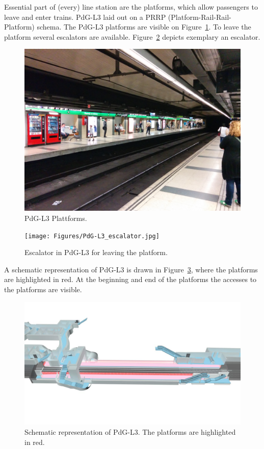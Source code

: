 Essential part of (every) line station are the platforms, which allow passengers to leave and enter trains. PdG-L3 laid out on a PRRP (Platform-Rail-Rail-Platform) schema. The PdG-L3 platforms are visible on Figure~\ref{fig:PdG-L3_platforms}. To leave the platform several escalators are available. Figure~\ref{fig:PdG-L3_escalator} depicts exemplary an escalator.

\begin{figure}[htbp]
  \centering
  \includegraphics[width=\linewidth]{Figures/PdG-L3_platform.jpg} 
  \caption{PdG-L3 Plattforms. \cite{TMB_2014}}
  \label{fig:PdG-L3_platforms}
\end{figure}

\begin{figure}[htbp]
  \centering
  \texttt{[image: Figures/PdG-L3\_escalator.jpg]} 
  \caption{Escalator in PdG-L3 for leaving the platform. \cite{TMB_2014}}
  \label{fig:PdG-L3_escalator}
\end{figure}

A schematic representation of PdG-L3 is drawn in Figure~\ref{fig:PdG-L3_schematic}, where the platforms are highlighted in red. At the beginning and end of the platforms the accesses to the platforms are visible.

\begin{figure}[htbp]
  \centering
  \includegraphics[width=\linewidth]{Figures/PdG-L3_schematic2.jpg} 
  \caption{Schematic representation of PdG-L3. The platforms are highlighted in red. \cite{TMB}}
  \label{fig:PdG-L3_schematic}
\end{figure}

